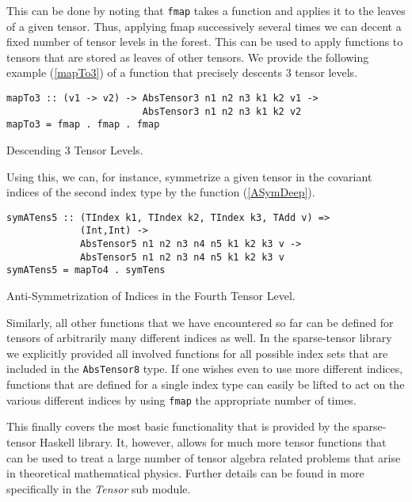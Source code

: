 This can be done by noting that \texttt{fmap} takes a function and applies it to the leaves of a given tensor. Thus, applying fmap successively several times we can decent a fixed number of tensor levels in the forest. This can be used to apply functions to tensors that are stored as leaves of other tensors. We provide the following example (\ref{mapTo3}) of a function that precisely descents $3$ tensor levels.
\begin{listing}[hbt!]
\begin{verbatim}
mapTo3 :: (v1 -> v2) -> AbsTensor3 n1 n2 n3 k1 k2 v1 -> 
                        AbsTensor3 n1 n2 n3 k1 k2 v2
mapTo3 = fmap . fmap . fmap
\end{verbatim}
\caption{Descending 3 Tensor Levels.}\label{mapTo3}
\end{listing}
Using this, we can, for instance, symmetrize a given tensor in the covariant indices of the second index type by the function (\ref{ASymDeep}).
\begin{listing}[hbt!]
\begin{verbatim}
symATens5 :: (TIndex k1, TIndex k2, TIndex k3, TAdd v) =>
             (Int,Int) ->
             AbsTensor5 n1 n2 n3 n4 n5 k1 k2 k3 v ->
             AbsTensor5 n1 n2 n3 n4 n5 k1 k2 k3 v
symATens5 = mapTo4 . symTens
\end{verbatim} 
\caption{Anti-Symmetrization of Indices in the Fourth Tensor Level. }\label{ASymDeep}
\end{listing}
Similarly, all other functions that we have encountered so far can be defined for tensors of arbitrarily many different indices as well. In the sparse-tensor library we explicitly provided all involved functions for all possible index sets that are included in the \texttt{AbsTensor8} type. If one wishes even to use more different indices, functions that are defined for a single index type can easily be lifted to act on the various different indices by using \texttt{fmap} the appropriate number of times. 

This finally covers the most basic functionality that is provided by the sparse-tensor Haskell library. It, however, allows for much more tensor functions that can be used to treat a large number of tensor algebra related problems that arise in theoretical mathematical physics. 
Further details can be found in \cite{sparse-tensor} more specifically in the \textit{Tensor} sub module.

